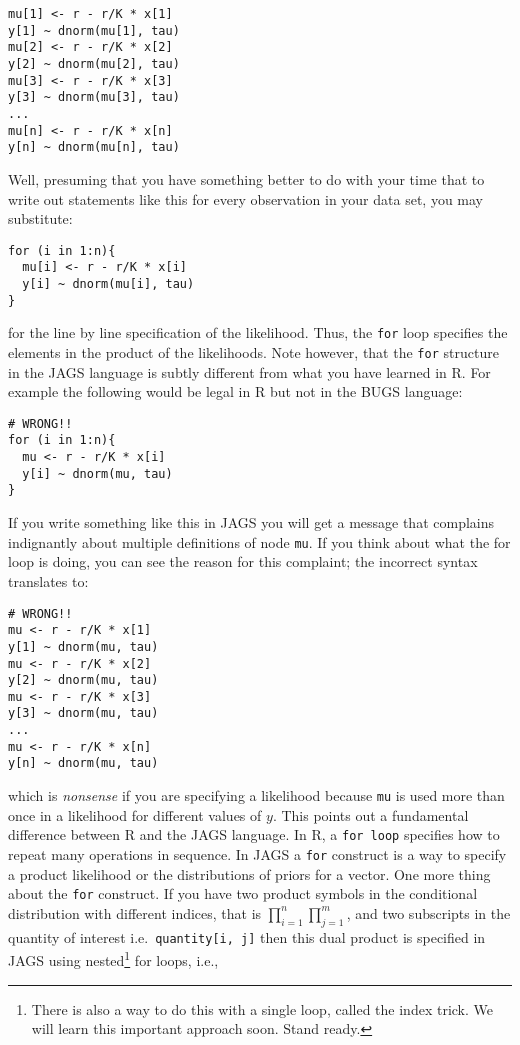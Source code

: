 \documentclass[12pt,english]{article}
\begin{document}
\begin{Verbatim}
mu[1] <- r - r/K * x[1]
y[1] ~ dnorm(mu[1], tau)
mu[2] <- r - r/K * x[2]
y[2] ~ dnorm(mu[2], tau)
mu[3] <- r - r/K * x[3]
y[3] ~ dnorm(mu[3], tau)
...
mu[n] <- r - r/K * x[n]
y[n] ~ dnorm(mu[n], tau)
\end{Verbatim}

\noindent Well, presuming that you have something better to do with your time that to write out statements like this for every observation in your data set, you may substitute:

\begin{Verbatim}
for (i in 1:n){
  mu[i] <- r - r/K * x[i]
  y[i] ~ dnorm(mu[i], tau)
}
\end{Verbatim}

\noindent for the line by line specification of the likelihood. Thus, the \texttt{for} loop specifies the elements in the product of the likelihoods. Note however, that the \texttt{for} structure in the JAGS language is subtly different from what you have learned in R. For example the following would be legal in R but not in the BUGS language:

\begin{Verbatim}
# WRONG!!
for (i in 1:n){
  mu <- r - r/K * x[i]
  y[i] ~ dnorm(mu, tau)
}
\end{Verbatim}

\noindent If you write something like this in JAGS you will get a message that complains indignantly about multiple definitions of node \texttt{mu}. If you think about what the for loop is doing, you can see the reason for this complaint; the incorrect syntax translates to:

\begin{Verbatim}
# WRONG!!
mu <- r - r/K * x[1]
y[1] ~ dnorm(mu, tau)
mu <- r - r/K * x[2]
y[2] ~ dnorm(mu, tau)
mu <- r - r/K * x[3]
y[3] ~ dnorm(mu, tau)
...
mu <- r - r/K * x[n]
y[n] ~ dnorm(mu, tau)
\end{Verbatim}

\noindent which is \emph{nonsense} if you are specifying a likelihood because \texttt{mu} is used more than once in a likelihood for different values of $y$. This points out a fundamental difference between R and the JAGS language. In R, a \texttt{for loop} specifies how to repeat many operations in sequence. In JAGS a \texttt{for} construct is a way to specify a product likelihood or the distributions of priors for a vector. One more thing about the \texttt{for} construct. If you have two product symbols in the conditional distribution with different indices, that is $\prod_{i=1}^{n}\prod_{j=1}^{m}$, and two subscripts in the quantity of interest i.e.\ \texttt{quantity[i, j]} then this dual product is specified in JAGS using nested\footnote{There is also a way to do this with a single loop, called the index trick. We will learn this important approach soon. Stand ready.} for loops, i.e.,
\end{document}

